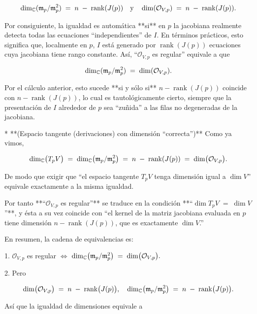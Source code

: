   $$
    \dim_{\mathbb{C}}(\mathfrak m_p / \mathfrak m_p^2)
    \;=\;
    n \;-\; \operatorname{rank}(J(p))
    \quad\text{y}\quad
    \dim(\mathcal O_{V,p})
    \;=\;
    n \;-\; \operatorname{rank}(J(p)).
  $$

  Por consiguiente, la igualdad es automática **si** en $p$ la jacobiana realmente detecta todas las ecuaciones “independientes” de $I$.  En términos prácticos, esto significa que, localmente en $p$, $I$ está generado por $\operatorname{rank}(J(p))$ ecuaciones cuya jacobiana tiene rango constante.  Así, “$\mathcal O_{V,p}$ es regular” equivale a que

  $$
    \dim_{\mathbb{C}}(\mathfrak m_p / \mathfrak m_p^2)
    \;=\;
    \dim(\mathcal O_{V,p}).
  $$

  Por el cálculo anterior, esto sucede **si y sólo si** $n - \operatorname{rank}(J(p))$ coincide con $n - \operatorname{rank}(J(p))$, lo cual es tautológicamente cierto, siempre que la presentación de $I$ alrededor de $p$ sea “zuñida” a las filas no degeneradas de la jacobiana.

* **(Espacio tangente (derivaciones) con dimensión “correcta”)**
  Como ya vimos,

  $$
    \dim_{\mathbb{C}}\bigl(T_p V\bigr)
    \;=\;
    \dim_{\mathbb{C}}\bigl(\mathfrak m_p / \mathfrak m_p^2\bigr)
    \;=\;
    n \;-\; \operatorname{rank}(J(p))
    \;=\;
    \dim\bigl(\mathcal O_{V,p}\bigr).
  $$

  De modo que exigir que “el espacio tangente $T_p V$ tenga dimensión igual a $\dim V$” equivale exactamente a la misma igualdad.

Por tanto **“$\mathcal O_{V,p}$ es regular”** se traduce en la condición **“$\dim T_p V \;=\; \dim V$”**, y ésta a su vez coincide con “el kernel de la matriz jacobiana evaluada en $p$ tiene dimensión $n-\operatorname{rank}(J(p))$, que es exactamente $\dim V$.”

En resumen, la cadena de equivalencias es:

1. $\mathcal O_{V,p}$ es regular
   $\Longleftrightarrow$
   $\dim_{\mathbb{C}}\bigl(\mathfrak m_p / \mathfrak m_p^2\bigr) \;=\; \dim\bigl(\mathcal O_{V,p}\bigr).$

2. Pero

   $$
     \dim\bigl(\mathcal O_{V,p}\bigr)
     \;=\;
     n \;-\; \operatorname{rank}\bigl(J(p)\bigr),
     \quad
     \dim_{\mathbb{C}}\bigl(\mathfrak m_p / \mathfrak m_p^2\bigr)
     \;=\;
     n \;-\; \operatorname{rank}\bigl(J(p)\bigr).
   $$

   Así que la igualdad de dimensiones equivale a

